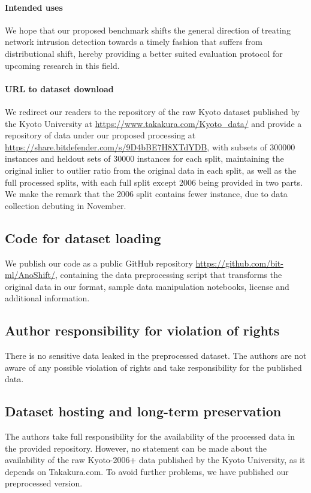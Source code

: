 \documentclass{article}
\begin{document}
\paragraph{Intended uses}
We hope that our proposed benchmark shifts the general direction of treating network intrusion detection towards a timely fashion that suffers from distributional shift, hereby providing a better suited evaluation protocol for upcoming research in this field.

\paragraph{URL to dataset download}
We redirect our readers to the repository of the raw Kyoto dataset published by the Kyoto University at \url{https://www.takakura.com/Kyoto_data/} and provide a repository of data under our proposed processing at \url{https://share.bitdefender.com/s/9D4bBE7H8XTdYDB}, with subsets of 300000 instances and heldout sets of 30000 instances for each split, maintaining the original inlier to outlier ratio from the original data in each split, as well as the full processed splits, with each full split except 2006 being provided in two parts. We make the remark that the 2006 split contains fewer instance, due to data collection debuting in November.

\subsection{Code for dataset loading}
We publish our code as a public GitHub repository \url{https://github.com/bit-ml/AnoShift/}, containing the data preprocessing script that transforms the original data in our format, sample data manipulation notebooks, license and additional information.

\subsection{Author responsibility for violation of rights}
There is no sensitive data leaked in the preprocessed dataset. The authors are not aware of any possible violation of rights and take responsibility for the published data.

\subsection{Dataset hosting and long-term preservation}
The authors take full responsibility for the availability of the processed data in the provided repository. However, no statement can be made about the availability of the raw Kyoto-2006+ data published by the Kyoto University, as it depends on Takakura.com. To avoid further problems, we have published our preprocessed version.
\end{document}
